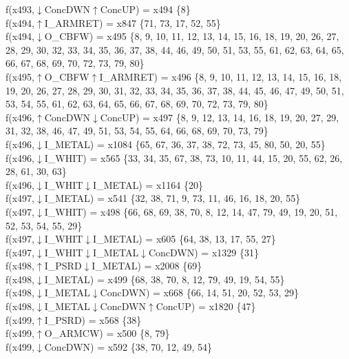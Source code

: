 f(x493,$\downarrow$ConcDWN$\uparrow$ConcUP) = x494 \{8\} \\  
f(x494,$\uparrow$I\_ARMRET) = x847 \{71, 73, 17, 52, 55\} \\  
f(x494,$\downarrow$O\_CBFW) = x495 \{8, 9, 10, 11, 12, 13, 14, 15, 16, 18, 19, 20, 26, 27, 28, 29, 30, 32, 33, 34, 35, 36, 37, 38, 44, 46, 49, 50, 51, 53, 55, 61, 62, 63, 64, 65, 66, 67, 68, 69, 70, 72, 73, 79, 80\} \\  
f(x495,$\uparrow$O\_CBFW$\uparrow$I\_ARMRET) = x496 \{8, 9, 10, 11, 12, 13, 14, 15, 16, 18, 19, 20, 26, 27, 28, 29, 30, 31, 32, 33, 34, 35, 36, 37, 38, 44, 45, 46, 47, 49, 50, 51, 53, 54, 55, 61, 62, 63, 64, 65, 66, 67, 68, 69, 70, 72, 73, 79, 80\} \\  
f(x496,$\uparrow$ConcDWN$\downarrow$ConcUP) = x497 \{8, 9, 12, 13, 14, 16, 18, 19, 20, 27, 29, 31, 32, 38, 46, 47, 49, 51, 53, 54, 55, 64, 66, 68, 69, 70, 73, 79\} \\  
f(x496,$\downarrow$I\_METAL) = x1084 \{65, 67, 36, 37, 38, 72, 73, 45, 80, 50, 20, 55\} \\  
f(x496,$\downarrow$I\_WHIT) = x565 \{33, 34, 35, 67, 38, 73, 10, 11, 44, 15, 20, 55, 62, 26, 28, 61, 30, 63\} \\  
f(x496,$\downarrow$I\_WHIT$\downarrow$I\_METAL) = x1164 \{20\} \\  
f(x497,$\downarrow$I\_METAL) = x541 \{32, 38, 71, 9, 73, 11, 46, 16, 18, 20, 55\} \\  
f(x497,$\downarrow$I\_WHIT) = x498 \{66, 68, 69, 38, 70, 8, 12, 14, 47, 79, 49, 19, 20, 51, 52, 53, 54, 55, 29\} \\  
f(x497,$\downarrow$I\_WHIT$\downarrow$I\_METAL) = x605 \{64, 38, 13, 17, 55, 27\} \\  
f(x497,$\downarrow$I\_WHIT$\downarrow$I\_METAL$\downarrow$ConcDWN) = x1329 \{31\} \\  
f(x498,$\uparrow$I\_PSRD$\downarrow$I\_METAL) = x2008 \{69\} \\  
f(x498,$\downarrow$I\_METAL) = x499 \{68, 38, 70, 8, 12, 79, 49, 19, 54, 55\} \\  
f(x498,$\downarrow$I\_METAL$\downarrow$ConcDWN) = x668 \{66, 14, 51, 20, 52, 53, 29\} \\  
f(x498,$\downarrow$I\_METAL$\downarrow$ConcDWN$\uparrow$ConcUP) = x1820 \{47\} \\  
f(x499,$\uparrow$I\_PSRD) = x568 \{38\} \\  
f(x499,$\uparrow$O\_ARMCW) = x500 \{8, 79\} \\  
f(x499,$\downarrow$ConcDWN) = x592 \{38, 70, 12, 49, 54\} \\  
